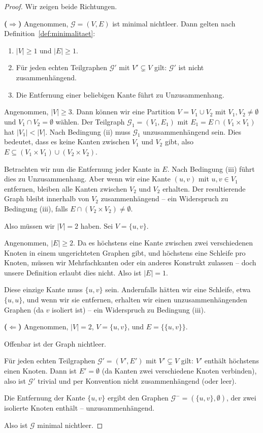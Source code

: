 \documentclass[12pt, a4paper]{article}
\theoremstyle{definition}
\theoremstyle{remark}
\newcommand{\Graph}{\mathcal{G}}
\begin{document}
\begin{proof}
Wir zeigen beide Richtungen.

\textbf{($\Rightarrow$)} Angenommen, $\Graph = (V, E)$ ist minimal nichtleer. Dann gelten nach Definition~\ref{def:minimalitaet}:
\begin{enumerate}[label=(\roman*)]
  \item $|V| \geq 1$ und $|E| \geq 1$.
  \item Für jeden echten Teilgraphen $\Graph'$ mit $V' \subsetneq V$ gilt: $\Graph'$ ist nicht zusammenhängend.
  \item Die Entfernung einer beliebigen Kante führt zu Unzusammenhang.
\end{enumerate}

Angenommen, $|V| \geq 3$. Dann können wir eine Partition $V = V_1 \cup V_2$ mit $V_1, V_2 \neq \emptyset$ und $V_1 \cap V_2 = \emptyset$ wählen. Der Teilgraph $\Graph_1 = (V_1, E_1)$ mit $E_1 = E \cap (V_1 \times V_1)$ hat $|V_1| < |V|$. Nach Bedingung (ii) muss $\Graph_1$ unzusammenhängend sein. Dies bedeutet, dass es keine Kanten zwischen $V_1$ und $V_2$ gibt, also $E \subseteq (V_1 \times V_1) \cup (V_2 \times V_2)$.

Betrachten wir nun die Entfernung jeder Kante in $E$. Nach Bedingung (iii) führt dies zu Unzusammenhang. Aber wenn wir eine Kante $(u, v)$ mit $u, v \in V_1$ entfernen, bleiben alle Kanten zwischen $V_2$ und $V_2$ erhalten. Der resultierende Graph bleibt innerhalb von $V_2$ zusammenhängend -- ein Widerspruch zu Bedingung (iii), falls $E \cap (V_2 \times V_2) \neq \emptyset$.

Also müssen wir $|V| = 2$ haben. Sei $V = \{u, v\}$.

Angenommen, $|E| \geq 2$. Da es höchstens eine Kante zwischen zwei verschiedenen Knoten in einem ungerichteten Graphen gibt, und höchstens eine Schleife pro Knoten, müssen wir Mehrfachkanten oder ein anderes Konstrukt zulassen -- doch unsere Definition erlaubt dies nicht. Also ist $|E| = 1$.

Diese einzige Kante muss $\{u, v\}$ sein. Andernfalls hätten wir eine Schleife, etwa $\{u, u\}$, und wenn wir sie entfernen, erhalten wir einen unzusammenhängenden Graphen (da $v$ isoliert ist) -- ein Widerspruch zu Bedingung (iii).

\textbf{($\Leftarrow$)} Angenommen, $|V| = 2$, $V = \{u, v\}$, und $E = \{\{u, v\}\}$. 

Offenbar ist der Graph nichtleer.

Für jeden echten Teilgraphen $\Graph' = (V', E')$ mit $V' \subsetneq V$ gilt: $V'$ enthält höchstens einen Knoten. Dann ist $E' = \emptyset$ (da Kanten zwei verschiedene Knoten verbinden), also ist $\Graph'$ trivial und per Konvention nicht zusammenhängend (oder leer).

Die Entfernung der Kante $\{u, v\}$ ergibt den Graphen $\Graph^- = (\{u, v\}, \emptyset)$, der zwei isolierte Knoten enthält -- unzusammenhängend.

Also ist $\Graph$ minimal nichtleer.
\end{proof}
\end{document}
